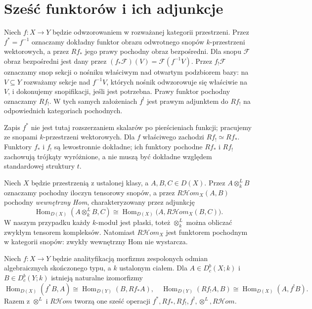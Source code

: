 \section{Sześć funktorów i ich adjunkcje}
\begin{definicja}
Niech $f:X\to Y$ będzie odwzorowaniem w rozważanej kategorii przestrzeni.
Przez $f^*=f^{-1}$ oznaczamy dokładny funktor obrazu odwrotnego
snopów $k$-przestrzeni wektorowych, a przez $Rf_*$ jego prawy
pochodny obraz bezpośredni. Dla snopu $\mathcal F$ obraz bezpośredni
jest dany przez $(f_*\mathcal F)(V)=\mathcal F(f^{-1}V)$.
Przez $f_!\mathcal F$ oznaczamy snop sekcji o nośniku właściwym
nad otwartym podzbiorem bazy: na $V\subseteq Y$ rozważamy
sekcje nad $f^{-1}V$, których nośnik odwzorowuje się właściwie na $V$,
i dokonujemy snopifikacji, jeśli jest potrzebna. Prawy funktor
pochodny oznaczamy $Rf_!$. W tych samych założeniach $f^!$
jest prawym adjunktem do $Rf_!$ na odpowiednich kategoriach
pochodnych.
\end{definicja}
\begin{uwaga}
Zapis $f^*$ nie jest tutaj rozszerzaniem skalarów po pierścieniach
funkcji; pracujemy ze snopami $k$-przestrzeni wektorowych.
Dla $f$ właściwego zachodzi $Rf_!\simeq Rf_*$. Funktory
$f_*$ i $f_!$ są lewostronnie dokładne; ich funktory
pochodne $Rf_*$ i $Rf_!$ zachowują trójkąty wyróżnione,
a nie muszą być dokładne względem standardowej struktury $t$.
\end{uwaga}
\begin{definicja}
Niech $X$ będzie przestrzenią z ustalonej klasy,
a $A,B,C\in D(X)$. Przez $A\otimes_k^L B$ oznaczamy
pochodny iloczyn tensorowy snopów, a przez
$R\mathcal Hom_X(A,B)$ pochodny \emph{wewnętrzny Hom},
charakteryzowany przez adjunkcję
\[
\operatorname{Hom}_{D(X)}(A\otimes_k^L B,C)
\cong\operatorname{Hom}_{D(X)}
\bigl(A,R\mathcal Hom_X(B,C)\bigr).
\]
W naszym przypadku każdy $k$-moduł jest płaski, toteż
$\otimes_k^L$ można obliczać zwykłym tensorem kompleksów.
Natomiast $R\mathcal Hom_X$ jest funktorem pochodnym w kategorii
snopów: zwykły wewnętrzny Hom nie wystarcza.
\end{definicja}
\begin{twierdzenie}
\label{thm:xvi-adjunctions}
Niech $f:X\to Y$ będzie analityfikacją morfizmu
zespolonych odmian algebraicznych skończonego typu,
a $k$ ustalonym ciałem. Dla $A\in D^b_c(X;k)$
i $B\in D^b_c(Y;k)$
istnieją naturalne izomorfizmy
\[
\operatorname{Hom}_{D(X)}(f^*B,A)
\cong\operatorname{Hom}_{D(Y)}(B,Rf_*A),
\quad
\operatorname{Hom}_{D(Y)}(Rf_!A,B)
\cong\operatorname{Hom}_{D(X)}(A,f^!B).
\]
Razem z $\otimes^L$ i $R\mathcal Hom$ tworzą one sześć
operacji $f^*,Rf_*,Rf_!,f^!,\otimes^L,R\mathcal Hom$.
\end{twierdzenie}
